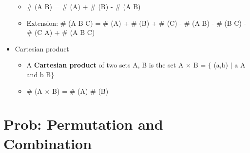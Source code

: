 \documentclass[12pt]{report}
\renewcommand{\_}{\kern-1.5pt\textunderscore\kern-1.5pt}
\begin{document}
\begin{itemize}
\begin{itemize}
	\item $\#$ (A  B) = $\#$ (A) + $\#$ (B) - $\#$ (A  B)\par

	\item Extension: $\#$ (A  B  C) = $\#$ (A) + $\#$ (B) + $\#$ (C) - $\#$ (A  B) - $\#$ (B  C) - $\#$ (C  A) + $\#$ (A  B  C)\par


\end{itemize}
	\item Cartesian product\par

\begin{itemize}
	\item A \textbf{Cartesian product} of two sets A, B is the set A $ \times $  B = $ \{ $ (a,b) $ \vert $  a  A and b  B$ \} $ \par

	\item $\#$ (A $ \times $  B) = $\#$ (A) $\#$ (B)\par


\end{itemize}
\end{itemize}\section*{Prob: Permutation and Combination}
\end{document}

